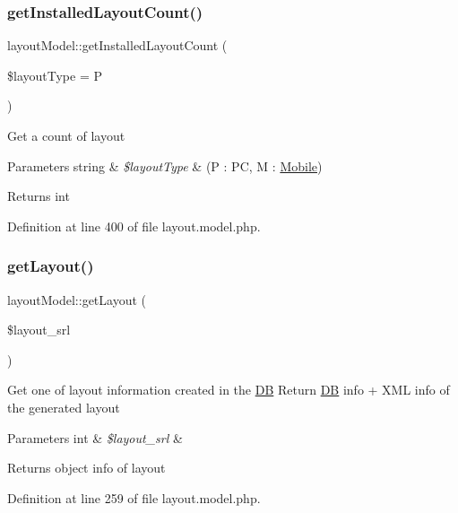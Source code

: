\subsubsection{\texorpdfstring{get\+Installed\+Layout\+Count()}{getInstalledLayoutCount()}}
{\footnotesize\ttfamily layout\+Model\+::get\+Installed\+Layout\+Count (\begin{DoxyParamCaption}\item[{}]{\$layout\+Type = {\ttfamily \textquotesingle{}P\textquotesingle{}} }\end{DoxyParamCaption})}

Get a count of layout 
\begin{DoxyParams}[1]{Parameters}
string & {\em \$layout\+Type} & (P \+: PC, M \+: \hyperlink{classMobile}{Mobile}) \\
\hline
\end{DoxyParams}
\begin{DoxyReturn}{Returns}
int 
\end{DoxyReturn}


Definition at line 400 of file layout.\+model.\+php.

\mbox{\label{classlayoutModel_a46f845328e6b65e772408ceb990adb6b}} 
\subsubsection{\texorpdfstring{get\+Layout()}{getLayout()}}
{\footnotesize\ttfamily layout\+Model\+::get\+Layout (\begin{DoxyParamCaption}\item[{}]{\$layout\+\_\+srl }\end{DoxyParamCaption})}

Get one of layout information created in the \hyperlink{classDB}{DB} Return \hyperlink{classDB}{DB} info + X\+ML info of the generated layout 
\begin{DoxyParams}[1]{Parameters}
int & {\em \$layout\+\_\+srl} & \\
\hline
\end{DoxyParams}
\begin{DoxyReturn}{Returns}
object info of layout 
\end{DoxyReturn}


Definition at line 259 of file layout.\+model.\+php.

\mbox{\label{classlayoutModel_afdd4cdf78d44f0a042522112818ddf11}} 
